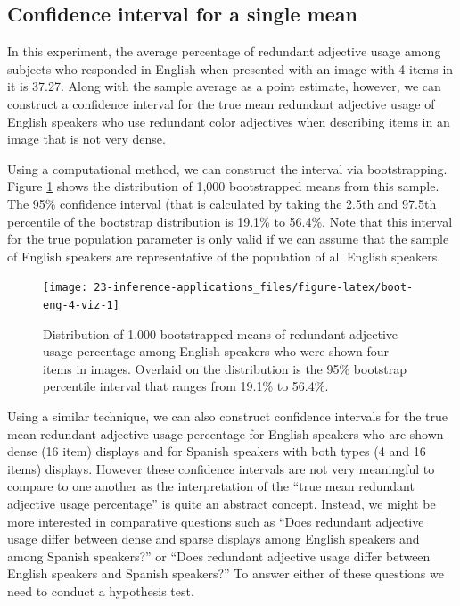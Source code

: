 \documentclass[
  10pt,
  openany]{book}
\begin{document}
\hypertarget{confidence-interval-for-a-single-mean}{%
\subsection{Confidence interval for a single mean}\label{confidence-interval-for-a-single-mean}}

In this experiment, the average percentage of redundant adjective usage among subjects who responded in English when presented with an image with 4 items in it is 37.27.
Along with the sample average as a point estimate, however, we can construct a confidence interval for the true mean redundant adjective usage of English speakers who use redundant color adjectives when describing items in an image that is not very dense.

Using a computational method, we can construct the interval via bootstrapping.
Figure \ref{fig:boot-eng-4-viz} shows the distribution of 1,000 bootstrapped means from this sample.
The 95\% confidence interval (that is calculated by taking the 2.5th and 97.5th percentile of the bootstrap distribution is 19.1\% to 56.4\%.
Note that this interval for the true population parameter is only valid if we can assume that the sample of English speakers are representative of the population of all English speakers.

\begin{figure}[h]

{\centering \texttt{[image: 23-inference-applications\_files/figure-latex/boot-eng-4-viz-1]} 

}

\caption{Distribution of 1,000 bootstrapped means of redundant adjective usage percentage among English speakers who were shown four items in images. Overlaid on the distribution is the 95\% bootstrap percentile interval that ranges from 19.1\% to 56.4\%.}\label{fig:boot-eng-4-viz}
\end{figure}



Using a similar technique, we can also construct confidence intervals for the true mean redundant adjective usage percentage for English speakers who are shown dense (16 item) displays and for Spanish speakers with both types (4 and 16 items) displays.
However these confidence intervals are not very meaningful to compare to one another as the interpretation of the ``true mean redundant adjective usage percentage'' is quite an abstract concept.
Instead, we might be more interested in comparative questions such as ``Does redundant adjective usage differ between dense and sparse displays among English speakers and among Spanish speakers?'' or ``Does redundant adjective usage differ between English speakers and Spanish speakers?'' To answer either of these questions we need to conduct a hypothesis test.
\end{document}
